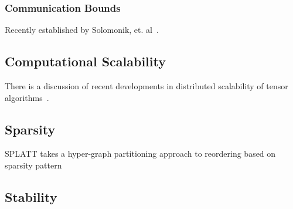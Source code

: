 \subsubsection{Communication Bounds}
Recently established by Solomonik, et. al~\cite{commlow}.

\subsection{Computational Scalability}
There is a discussion of recent developments in distributed scalability of tensor algorithms~\cite{falbull}.

\subsection{Sparsity}
SPLATT takes a hyper-graph partitioning approach to reordering based on sparsity pattern~\cite{SPLATT}

\subsection{Stability}


